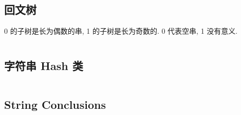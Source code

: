 				\subsection{回文树}
					0 的子树是长为偶数的串, 1 的子树是长为奇数的. 0 代表空串, 1 没有意义.
					\inputminted{cpp}{src/String/PAM.cpp}
				\subsection{字符串 Hash 类}
				\texttt{}
				\inputminted{cpp}{src/String/hash.cpp}
				\subsection{String Conclusions}
					
			\newpage
